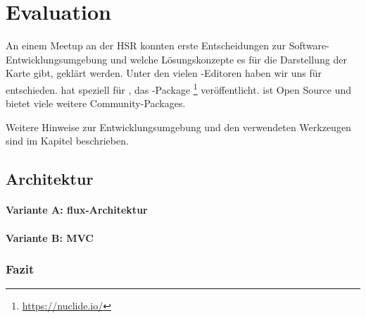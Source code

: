 \chapter{Evaluation}
\label{tb-evaluation}
An einem  Meetup an der HSR konnten erste Entscheidungen zur Software-Entwicklungsumgebung und welche Lösungskonzepte es für die Darstellung der Karte gibt, geklärt werden.
Unter den vielen -Editoren haben wir uns für  entschieden.
 hat speziell für ,  das -Package \footnote{\url{https://nuclide.io/}} veröffentlicht. 
 ist Open Source und bietet viele weitere Community-Packages.

Weitere Hinweise zur Entwicklungsumgebung und den verwendeten Werkzeugen sind im Kapitel  beschrieben.

\section{Architektur}


\subsubsection{Variante A: flux-Architektur}


\subsubsection{Variante B: MVC}


\subsection{Fazit}



